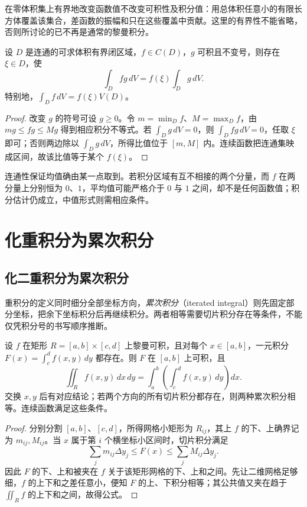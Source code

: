 在零体积集上有界地改变函数值不改变可积性及积分值：用总体积任意小的有限长方体覆盖该集合，差函数的振幅和只在这些覆盖中贡献。这里的有界性不能省略，否则所讨论的已不再是通常的黎曼积分。

\begin{theorem}[重积分第一中值定理]
\label{thm:multiple-weighted-mean-value}
设 $D$ 是连通的可求体积有界闭区域，$f\in C(D)$，$g$ 可积且不变号，则存在 $\xi\in D$，使
\begin{equation}
    \int_Dfg\,dV=f(\xi)\int_Dg\,dV.
    \label{eq:multiple-weighted-mean-value}
\end{equation}
特别地，$\int_Df\,dV=f(\xi)V(D)$。
\end{theorem}
\begin{proof}
改变 $g$ 的符号可设 $g\geq0$。令 $m=\min_Df$、$M=\max_Df$，由 $mg\leq fg\leq Mg$ 得到相应积分不等式。若 $\int_Dg\,dV=0$，则 $\int_Dfg\,dV=0$，任取 $\xi$ 即可；否则两边除以 $\int_Dg\,dV$，所得比值位于 $[m,M]$ 内。连续函数把连通集映成区间，故该比值等于某个 $f(\xi)$。
\end{proof}

连通性保证均值确由某一点取到。若积分区域有互不相接的两个分量，而 $f$ 在两分量上分别恒为 $0$、$1$，平均值可能严格介于 $0$ 与 $1$ 之间，却不是任何函数值；积分估计仍成立，中值形式则需相应条件。

\section{化重积分为累次积分}
\label{sec:reduction-of-multiple-integrals-to-iterated-integrals}

\subsection{化二重积分为累次积分}
\label{subsec:reduction-of-double-integrals-to-iterated-integrals}

重积分的定义同时细分全部坐标方向，\emph{累次积分}（iterated integral）则先固定部分坐标，把余下坐标积分后再继续积分。两者相等需要切片积分存在等条件，不能仅凭积分号的书写顺序推断。

\begin{theorem}[矩形上的累次积分公式]
\label{thm:multiple-rectangle-fubini}
设 $f$ 在矩形 $R=[a,b]\times[c,d]$ 上黎曼可积，且对每个 $x\in[a,b]$，一元积分 $F(x)=\int_c^df(x,y)\,dy$ 都存在。则 $F$ 在 $[a,b]$ 上可积，且
\begin{equation}
    \iint_Rf(x,y)\,dx\,dy
    =\int_a^b\left(\int_c^df(x,y)\,dy\right)dx.
    \label{eq:multiple-rectangle-fubini}
\end{equation}
交换 $x,y$ 后有对应结论；若两个方向的所有切片积分都存在，则两种累次积分相等。连续函数满足这些条件。
\end{theorem}
\begin{proof}
分别分割 $[a,b]$、$[c,d]$，所得网格小矩形为 $R_{ij}$，其上 $f$ 的下、上确界记为 $m_{ij},M_{ij}$。当 $x$ 属于第 $i$ 个横坐标小区间时，切片积分满足
\[
    \sum_jm_{ij}\Delta y_j\leq F(x)
    \leq\sum_jM_{ij}\Delta y_j.
\]
因此 $F$ 的下、上和被夹在 $f$ 关于该矩形网格的下、上和之间。先让二维网格足够细，$f$ 的上下和之差任意小，便知 $F$ 的上、下积分相等；其公共值又夹在趋于 $\iint_Rf$ 的上下和之间，故得公式。
\end{proof}

